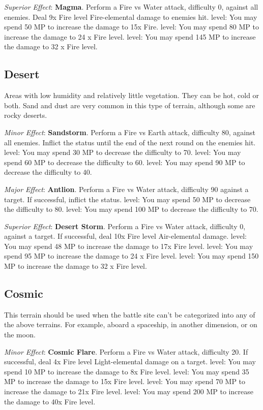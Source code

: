 \begin{multicols}{2}
\textit{Superior Effect}: \textbf{Magma}. Perform a Fire vs Water attack, difficulty 0, against all enemies. Deal 9x Fire level Fire-elemental damage to enemies hit.  level: You may spend 50 MP to increase the damage to 15x Fire.  level: You may spend 80 MP to increase the damage to 24 x Fire level.  level: You may spend 145 MP to increase the damage to 32 x Fire level.

\subsection*{Desert}\label{subsec:geo-desert}
Areas with low humidity and relatively little vegetation. They can be hot, cold or both. Sand and dust are very common in this type of terrain, although some are rocky deserts.

\textit{Minor Effect}: \textbf{Sandstorm}. Perform a Fire vs Earth attack, difficulty 80, against all enemies. Inflict the  status until the end of the next round on the enemies hit. level: You may spend 30 MP to decrease the difficulty to 70.  level: You may spend 60 MP to decrease the difficulty to 60.  level: You may spend 90 MP to decrease the difficulty to 40.

\textit{Major Effect}: \textbf{Antlion}. Perform a Fire vs Water attack, difficulty 90 against a target. If successful, inflict the  status\@.  level: You may spend 50 MP to decrease the difficulty to 80.  level: You may spend 100 MP to decrease the difficulty to 70.

\textit{Superior Effect}: \textbf{Desert Storm}. Perform a Fire vs Water attack, difficulty 0, against a target. If successful, deal 10x Fire level Air-elemental damage.  level: You may spend 48 MP to increase the damage to 17x Fire level.  level: You may spend 95 MP to increase the damage to 24 x Fire level.  level: You may spend 150 MP to increase the damage to 32 x Fire level.

\subsection*{Cosmic}\label{subsec:geo-cosmic}
This terrain should be used when the battle site can’t be categorized into any of the above terrains. For example, aboard a spaceship, in another dimension, or on the moon.

\textit{Minor Effect}: \textbf{Cosmic Flare}. Perform a Fire vs Water attack, difficulty 20. If successful, deal 4x Fire level Light-elemental damage on a target.  level: You may spend 10 MP to increase the damage to 8x Fire level.  level: You may spend 35 MP to increase the damage to 15x Fire level.  level: You may spend 70 MP to increase the damage to 21x Fire level.  level: You may spend 200 MP to increase the damage to 40x Fire level.


\end{multicols}
